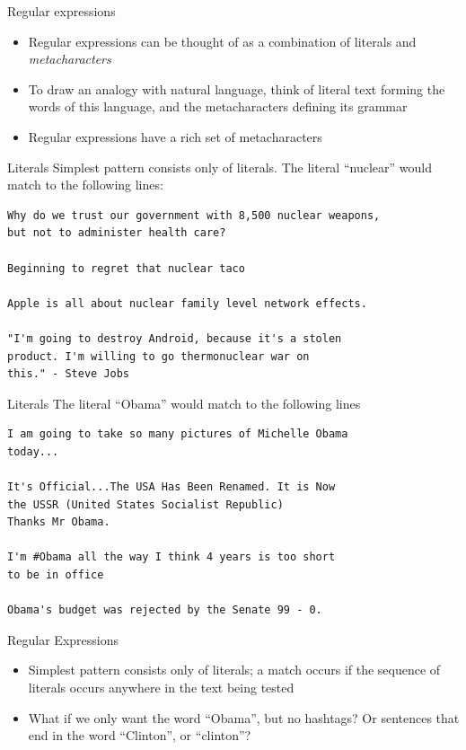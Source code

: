 \documentclass{beamer}
\begin{document}
\begin{frame}{Regular expressions}
\begin{itemize}
\item
Regular expressions can be thought of as a combination of literals and
\textit{metacharacters}
\item
To draw an analogy with natural language, think of literal text
forming the words of this language, and the metacharacters defining
its grammar
\item
Regular expressions have a rich set of metacharacters
\end{itemize}

\end{frame}

\begin{frame}[fragile]{Literals}
Simplest pattern consists only of literals.  The literal ``nuclear''
would match to the following lines:
\begin{verbatim}
Why do we trust our government with 8,500 nuclear weapons, 
but not to administer health care?

Beginning to regret that nuclear taco

Apple is all about nuclear family level network effects.

"I'm going to destroy Android, because it's a stolen 
product. I'm willing to go thermonuclear war on 
this." - Steve Jobs
\end{verbatim}
\end{frame}

\begin{frame}[fragile]{Literals}
The literal ``Obama'' would match to the following lines
\begin{verbatim}
I am going to take so many pictures of Michelle Obama 
today...

It's Official...The USA Has Been Renamed. It is Now 
the USSR (United States Socialist Republic) 
Thanks Mr Obama.

I'm #Obama all the way I think 4 years is too short 
to be in office

Obama's budget was rejected by the Senate 99 - 0.
\end{verbatim}
\end{frame}

\begin{frame}{Regular Expressions}
\begin{itemize}
\item
Simplest pattern consists only of literals; a match occurs if the
sequence of literals occurs anywhere in the text being tested
\item
What if we only want the word ``Obama'', but no hashtags? Or sentences that end in 
the word ``Clinton'', or ``clinton''? 
\end{itemize}
\end{frame}
\end{document}
